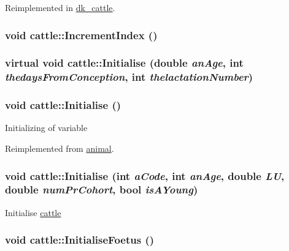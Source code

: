 Reimplemented in \hyperlink{classdk__cattle_aa008034a90d25b2682169fc87651a45b}{dk\_\-cattle}.\hypertarget{classcattle_ae68f10b2d5e32d120b4d90b5922534cf}{
\subsubsection[{IncrementIndex}]{\setlength{\rightskip}{0pt plus 5cm}void cattle::IncrementIndex ()}}
\label{classcattle_ae68f10b2d5e32d120b4d90b5922534cf}
\hypertarget{classcattle_a1ff860afd88aa3c58c66a5291ccbacb5}{
\subsubsection[{Initialise}]{\setlength{\rightskip}{0pt plus 5cm}virtual void cattle::Initialise (double {\em anAge}, \/  int {\em thedaysFromConception}, \/  int {\em thelactationNumber})}}
\label{classcattle_a1ff860afd88aa3c58c66a5291ccbacb5}
\hypertarget{classcattle_a7a2111adbacdb6ec477005ac5779077b}{
\subsubsection[{Initialise}]{\setlength{\rightskip}{0pt plus 5cm}void cattle::Initialise ()}}
\label{classcattle_a7a2111adbacdb6ec477005ac5779077b}
Initializing of variable 

Reimplemented from \hyperlink{classanimal_a06e14e53c94c2184ec43993b78b8d74b}{animal}.\hypertarget{classcattle_ab606ffff933142bc469c151721050d2d}{
\subsubsection[{Initialise}]{\setlength{\rightskip}{0pt plus 5cm}void cattle::Initialise (int {\em aCode}, \/  int {\em anAge}, \/  double {\em LU}, \/  double {\em numPrCohort}, \/  bool {\em isAYoung})}}
\label{classcattle_ab606ffff933142bc469c151721050d2d}
Initialise \hyperlink{classcattle}{cattle} \hypertarget{classcattle_ab41b2206b12b2f5bd16dd817960315bd}{
\subsubsection[{InitialiseFoetus}]{\setlength{\rightskip}{0pt plus 5cm}void cattle::InitialiseFoetus ()}}
\label{classcattle_ab41b2206b12b2f5bd16dd817960315bd}


